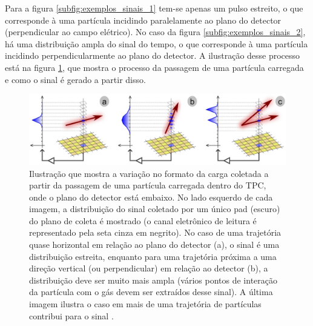 \documentclass[a4paper,12pt,oneside]{book}
\begin{document}

\par Para a figura \ref{subfig:exemplos_sinais_1} tem-se apenas um pulso estreito, o que corresponde à uma partícula incidindo paralelamente ao plano do detector (perpendicular ao campo elétrico). No caso da figura \ref{subfig:exemplos_sinais_2}, há uma distribuição ampla do sinal do tempo, o que corresponde à uma partícula incidindo perpendicularmente ao plano do detector. A ilustração desse processo está na figura \ref{fig:get_signal}, que mostra o processo da passagem de uma partícula carregada e como o sinal é gerado a partir disso.




\begin{figure}[H]
    \centering
    \includegraphics[scale = 0.29]{figs/get.png}
    \caption{Ilustração que mostra a variação no formato da carga coletada a partir da passagem de uma partícula carregada dentro do TPC, onde o plano do detector está embaixo. No lado esquerdo de cada imagem, a distribuição do sinal coletado por um único pad (escuro) do plano de coleta é mostrado (o canal eletrônico de leitura é representado pela seta cinza em negrito). No caso de uma trajetória quase horizontal em relação ao plano do detector (a), o sinal é uma distribuição estreita, enquanto para uma trajetória próxima a uma direção vertical (ou perpendicular) em relação ao detector (b), a distribuição deve ser muito mais ampla (vários pontos de interação da partícula com o gás devem ser extraídos desse sinal). A última imagem ilustra o caso em mais de uma trajetória de partículas contribui para o sinal \cite{GET}.}
    \label{fig:get_signal}
\end{figure}
\end{document}
